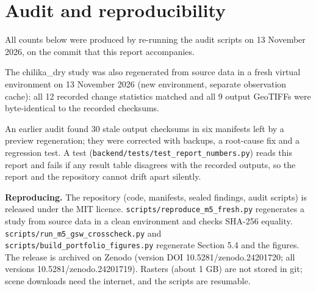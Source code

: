 \documentclass[11pt]{article}
\begin{document}
\section{Audit and reproducibility}

All counts below were produced by re-running the audit scripts on 13 November 2026, on the commit that this report accompanies.

\begin{table}[t]\centering\small
\caption{Verification record.}\label{tab:audit}
\end{table}

The chilika\_dry study was also regenerated from source data in a fresh virtual environment on 13 November 2026 (new environment, separate observation cache): all 12 recorded change statistics matched and all 9 output GeoTIFFs were byte-identical to the recorded checksums.

An earlier audit found 30 stale output checksums in six manifests left by a preview regeneration; they were corrected with backups, a root-cause fix and a regression test. A test (\texttt{backend/tests/test\_report\_numbers.py}) reads this report and fails if any result table disagrees with the recorded outputs, so the report and the repository cannot drift apart silently.

\textbf{Reproducing.} The repository (code, manifests, sealed findings, audit scripts) is released under the MIT licence. \texttt{scripts/reproduce\_m5\_fresh.py} regenerates a study from source data in a clean environment and checks SHA-256 equality. \texttt{scripts/run\_m5\_gsw\_crosscheck.py} and \texttt{scripts/build\_portfolio\_figures.py} regenerate Section 5.4 and the figures. The release is archived on Zenodo (version DOI 10.5281/zenodo.24201720; all versions 10.5281/zenodo.24201719). Rasters (about 1 GB) are not stored in git; scene downloads need the internet, and the scripts are resumable.
\end{document}
